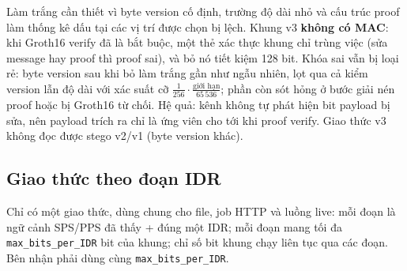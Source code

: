 \documentclass[11pt,a4paper]{article}
\begin{document}
Làm trắng cần thiết vì byte version cố định, trường độ dài nhỏ và cấu trúc proof làm
thống kê dấu tại các vị trí được chọn bị lệch. Khung v3 \textbf{không có MAC}: khi
Groth16 verify đã là bắt buộc, một thẻ xác thực khung chỉ trùng việc (sửa message hay
proof thì proof sai), và bỏ nó tiết kiệm 128 bit. Khóa sai vẫn bị loại rẻ: byte version
sau khi bỏ làm trắng gần như ngẫu nhiên, lọt qua cả kiểm version lẫn độ dài với xác suất
cỡ $\frac{1}{256}\cdot\frac{\text{giới hạn}}{65\,536}$; phần còn sót hỏng ở bước giải
nén proof hoặc bị Groth16 từ chối. Hệ quả: kênh không tự phát hiện bit payload bị sửa,
nên payload trích ra chỉ là ứng viên cho tới khi proof verify. Giao thức v3 không đọc
được stego v2/v1 (byte version khác).

\subsection{Giao thức theo đoạn IDR}

Chỉ có một giao thức, dùng chung cho file, job HTTP và luồng live: mỗi đoạn là
ngữ cảnh SPS/PPS đã thấy + đúng một IDR; mỗi đoạn mang tối đa
\texttt{max\_bits\_per\_IDR} bit của khung; chỉ số bit khung chạy liên tục qua các
đoạn. Bên nhận phải dùng cùng \texttt{max\_bits\_per\_IDR}.
\end{document}
